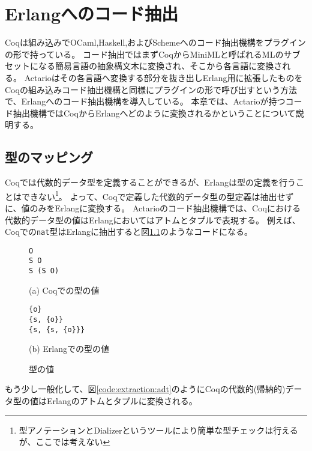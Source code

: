 \chapter{Erlangへのコード抽出}

Coqは組み込みでOCaml,Haskell,およびSchemeへのコード抽出機構をプラグインの形で持っている。
コード抽出ではまずCoqからMiniMLと呼ばれるMLのサブセットになる簡易言語の抽象構文木に変換され、そこから各言語に変換される。
Actarioはその各言語へ変換する部分を抜き出しErlang用に拡張したものをCoqの組み込みコード抽出機構と同様にプラグインの形で呼び出すという方法で、Erlangへのコード抽出機構を導入している。
本章では、Actarioが持つコード抽出機構ではCoqからErlangへどのように変換されるかということについて説明する。

\section{型のマッピング}

Coqでは代数的データ型を定義することができるが、Erlangは型の定義を行うことはできない\footnote{型アノテーションとDializerというツールにより簡単な型チェックは行えるが、ここでは考えない}。
よって、Coqで定義した代数的データ型の型定義は抽出せずに、値のみをErlangに変換する。
Actarioのコード抽出機構では、Coqにおける代数的データ型の値はErlangにおいてはアトムとタプルで表現する。
例えば、Coqでの\texttt{nat}型はErlangに抽出すると図\ref{code:extraction:datamapping-nat}のようなコードになる。

\begin{figure}\centering
\begin{minipage}{0.4\textwidth}\centering
\begin{lstlisting}[frame=single,numbers=none,xleftmargin=0pt]
O
S O
S (S O)
\end{lstlisting}
(a) Coqでの型の値
\end{minipage}
\hspace*{3ex}
\begin{minipage}{0.4\textwidth}\centering
\begin{lstlisting}[frame=single,numbers=none,xleftmargin=0pt]
{o}
{s, {o}}
{s, {s, {o}}}
\end{lstlisting}
(b) Erlangでの型の値
\end{minipage}
\label{code:extraction:datamapping-nat}
\caption{型の値}
\end{figure}

もう少し一般化して、図\ref{code:extraction:adt}のようにCoqの代数的(帰納的)データ型の値はErlangのアトムとタプルに変換される。

